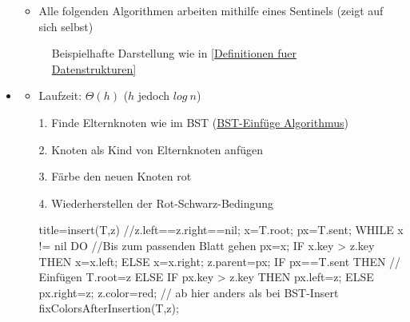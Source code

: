 \documentclass[
    12pt,
    a4paper,
    ngerman,
    color=3b,%
    marginpar=false,
    colorback=false,
    leqno,
]{tudaexercise}
\begin{document}
\begin{itemize}
\begin{itemize}
\begin{itemize}
                    \end{itemize}
                \item Alle folgenden Algorithmen arbeiten mithilfe eines Sentinels (zeigt auf sich selbst)
            \end{itemize}
            \begin{figure}[ht]
                \centering
                \caption{Beispielhafte Darstellung wie in \ref{Definitionen fuer Datenstrukturen}}
                \label{fig:red_black_tree_example}
            \end{figure}
            \clearpage
        \item {}
            \begin{itemize}
                \item Laufzeit: $\Theta(h)$ ($h$ jedoch $log~n$)
                \item[1.] Finde Elternknoten wie im BST (\hyperref[BST-Insert]{BST-Einfüge Algorithmus})
                \item[2.] Knoten als Kind von Elternknoten anfügen
                \item[3.] Färbe den neuen Knoten rot
                \item[4.] Wiederherstellen der Rot-Schwarz-Bedingung
                            \begin{ccode}[autogobble,escapeinside=||]{title={insert(T,z) //z.left==z.right==nil;}}
                                x=T.root; px=T.sent;
                                WHILE x != nil DO                   //Bis zum passenden Blatt gehen
                                    px=x;
                                    IF x.key > z.key THEN
                                        x=x.left;
                                    ELSE
                                        x=x.right;
                                z.parent=px;
                                IF px==T.sent THEN                  // Einfügen
                                    T.root=z
                                ELSE
                                    IF px.key > z.key THEN
                                        px.left=z;
                                    ELSE
                                        px.right=z;
                                z.color=red;                        // ab hier anders als bei BST-Insert
                                fixColorsAfterInsertion(T,z);
                            \end{ccode} 

\end{itemize}
\end{itemize}
\end{document}
